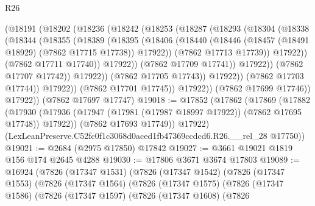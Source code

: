 \begin{lexlean}{R26}
\begin{coremodule}
                        (@18191
                          (@18202
                            (@18236
                              (@18242
                                (@18253
                                  (@18287
                                    (@18293
                                      (@18304
                                        (@18338
                                          (@18344
                                            (@18355
                                              (@18389
                                                (@18395
                                                  (@18406
                                                    (@18440
                                                      (@18446
                                                        (@18457
                                                          (@18491 @18929)
                                                          (@7862 @17715 @17738))
                                                        @17922))
                                                    (@7862 @17713 @17739))
                                                  @17922))
                                              (@7862 @17711 @17740))
                                            @17922))
                                        (@7862 @17709 @17741))
                                      @17922))
                                  (@7862 @17707 @17742))
                                @17922))
                            (@7862 @17705 @17743))
                          @17922))
                      (@7862 @17703 @17744))
                    @17922))
                (@7862 @17701 @17745))
              @17922))
          (@7862 @17699 @17746))
        @17922))
    (@7862 @17697 @17747)
@19018 := @17852
    (@17862
      (@17869
        (@17882
          (@17930 (@17936 (@17947 (@17981 (@17987 @18997 @17922)) (@7862 @17695 @17748)) @17922))
          (@7862 @17693 @17749))
        @17922)
      (LexLeanPreserve.C52fc0f1c3068d0aced1fb47369ccdcd6.R26.__rel_28 @17750))
@19021 := @2684 (@2975 @17850) @17842
@19027 := @3661 @19021 @1819 @156 @174 @2645 @4288
@19030 := @17806 @3671 @3674 @17803
@19089 := @16924
    (@7826
      (@17347 @1531)
      (@7826
        (@17347 @1542)
        (@7826
          (@17347 @1553)
          (@7826
            (@17347 @1564)
            (@7826
              (@17347 @1575)
              (@7826
                (@17347 @1586)
                (@7826
                  (@17347 @1597)
                  (@7826
                    (@17347 @1608)
                    (@7826

\end{coremodule}
\end{lexlean}
